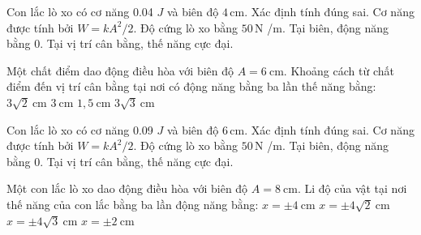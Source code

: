 \begin{ex}
Con lắc lò xo có cơ năng 0.04 $J$ và biên độ $4\,\text{cm}$. Xác định tính đúng sai.
\choiceTF
{\True Cơ năng được tính bởi $W=kA^2/2$.}
{\True Độ cứng lò xo bằng $50\,\text{N}$ /m.}
{\True Tại biên, động năng bằng 0.}
{Tại vị trí cân bằng, thế năng cực đại.}
\end{ex}

\begin{ex}
Một chất điểm dao động điều hòa với biên độ $A = 6\ \mathrm{cm}$. Khoảng cách từ chất điểm đến vị trí cân bằng tại nơi có động năng bằng ba lần thế năng bằng:
\choice
{$3\sqrt{2}\ \mathrm{cm}$}
{\True $3\ \mathrm{cm}$}
{$1,5\ \mathrm{cm}$}
{$3\sqrt{3}\ \mathrm{cm}$}
\end{ex}

\begin{ex}
Con lắc lò xo có cơ năng 0.09 $J$ và biên độ $6\,\text{cm}$. Xác định tính đúng sai.
\choiceTF
{\True Cơ năng được tính bởi $W=kA^2/2$.}
{\True Độ cứng lò xo bằng $50\,\text{N}$ /m.}
{\True Tại biên, động năng bằng 0.}
{Tại vị trí cân bằng, thế năng cực đại.}
\end{ex}

\begin{ex}
Một con lắc lò xo dao động điều hòa với biên độ $A = 8\ \mathrm{cm}$. Li độ của vật tại nơi thế năng của con lắc bằng ba lần động năng bằng:
\choice
{$x = \pm 4\ \mathrm{cm}$}
{$x = \pm 4\sqrt{2}\ \mathrm{cm}$}
{\True $x = \pm 4\sqrt{3}\ \mathrm{cm}$}
{$x = \pm 2\ \mathrm{cm}$}
\end{ex}

